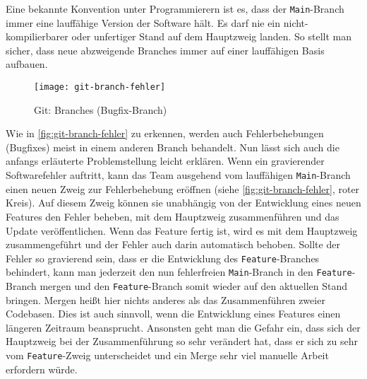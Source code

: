 Eine bekannte Konvention unter Programmierern ist es, dass der
\texttt{Main}-Branch immer eine lauffähige Version der Software hält. Es darf
nie ein nicht-kompilierbarer oder unfertiger Stand auf dem Hauptzweig landen.
So stellt man sicher, dass neue abzweigende Branches immer auf einer
lauffähigen Basis aufbauen. \parencite{git-branches}

\begin{figure}[H]
    \centering
    \texttt{[image: git-branch-fehler]}
    \caption{Git: Branches (Bugfix-Branch)}
    \label{fig:git-branch-fehler}
\end{figure}

Wie in \autoref{fig:git-branch-fehler} zu erkennen, werden auch Fehlerbehebungen
(Bugfixes) meist in einem anderen Branch behandelt. Nun lässt sich auch die
anfangs erläuterte Problemstellung leicht erklären. Wenn ein gravierender
Softwarefehler auftritt, kann das Team ausgehend vom lauffähigen
\texttt{Main}-Branch einen neuen Zweig zur Fehlerbehebung eröffnen (siehe
\autoref{fig:git-branch-fehler}, roter Kreis). Auf diesem Zweig können sie
unabhängig von der Entwicklung eines neuen Features den Fehler beheben, mit dem
Hauptzweig zusammenführen und das Update veröffentlichen. Wenn das Feature
fertig ist, wird es mit dem Hauptzweig zusammengeführt und der Fehler auch darin
automatisch behoben. Sollte der Fehler so gravierend sein, dass er die
Entwicklung des \texttt{Feature}-Branches behindert, kann man jederzeit den nun
fehlerfreien \texttt{Main}-Branch in den \texttt{Feature}-Branch mergen und den
\texttt{Feature}-Branch somit wieder auf den aktuellen Stand bringen. Mergen
heißt hier nichts anderes als das Zusammenführen zweier Codebasen. Dies ist auch
sinnvoll, wenn die Entwicklung eines Features einen längeren Zeitraum
beansprucht. Ansonsten geht man die Gefahr ein, dass sich der Hauptzweig bei der
Zusammenführung so sehr verändert hat, dass er sich zu sehr vom
\texttt{Feature}-Zweig unterscheidet und ein Merge sehr viel manuelle Arbeit
erfordern würde.
